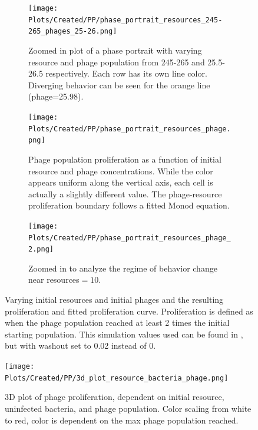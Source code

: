 \begin{figure}[]
    \centering
    \begin{subfigure}{0.49\linewidth}
        \centering
        \texttt{[image: Plots/Created/PP/phase\_portrait\_resources\_245-265\_phages\_25-26.png]}
        \caption{
            Zoomed in plot of a phase portrait with varying resource and phage population from 245-265 and 25.5-26.5 respectively. 
            Each row has its own line color. 
            Diverging behavior can be seen for the orange line (phage=25.98). 
        }
        \label{fig:created:phase_portrait_resources_245-265_phages_25-26}
    \end{subfigure}
    \hfill
    \begin{subfigure}{0.49\linewidth}
        \centering
        \texttt{[image: Plots/Created/PP/phase\_portrait\_resources\_phage.png]}
        \caption{
            Phage population proliferation as a function of initial resource and phage concentrations. 
            While the color appears uniform along the vertical axis, each cell is actually a slightly different value. 
            The phage-resource proliferation boundary follows a fitted Monod equation.
        }
        \label{fig:created:phase_portrait_resources_phage}
    \end{subfigure}
    \hfill
    \begin{subfigure}{0.49\linewidth}
        \centering
        \texttt{[image: Plots/Created/PP/phase\_portrait\_resources\_phage\_2.png]}
        \caption{
            Zoomed in to analyze the regime of behavior change near resources$=10$. 
        }
        \label{fig:created:phase_portrait_resources_phage_2}
    \end{subfigure}
    \caption{
        Varying initial resources and initial phages and the resulting proliferation and fitted proliferation curve. 
        Proliferation is defined as when the phage population reached at least 2 times the initial starting population. 
        This simulation values used can be found in , but with washout set to 0.02 instead of 0. 
    }
    \label{fig:created:phase_portrait_resource_phage_proliferate}
\end{figure}

\begin{figure}[]
    \texttt{[image: Plots/Created/PP/3d\_plot\_resource\_bacteria\_phage.png]}
    \centering
    \caption{
        3D plot of phage proliferation, dependent on initial resource, uninfected bacteria, and phage population. 
        Color scaling from white to red, color is dependent on the max phage population reached. 
    \label{fig:created:3D_phase_portrait}
    }
\end{figure}

